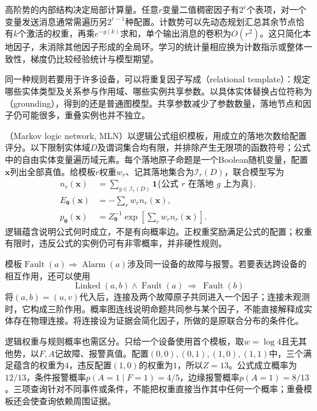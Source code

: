 高阶势的内部结构决定局部计算量。任意$r$变量二值稠密因子有$2^r$个表项，对一个变量发送消息通常需遍历另$2^{r-1}$种配置。计数势可以先动态规划汇总其余节点恰有$k$个激活的权重，再乘$e^{-g(k)}$求和，单个输出消息的卷积为$O(r^2)$。这只简化本地因子，未消除其他因子形成的全局环。学习的统计量相应换为计数指示或整体一致性，梯度仍比较经验统计与模型期望。

同一种规则若要用于许多设备，可以将重复因子写成（relational template）：规定哪些实体类型及关系参与作用域、哪些实例共享参数。以具体实体替换占位符称为（grounding），得到的还是普通图模型。共享参数减少了参数数量，落地节点和因子仍可能很多，重叠实例也并不独立。

（Markov logic network, MLN）以逻辑公式组织模板，用成立的落地次数给配置评分。以下限制实体域$D$及谓词集合均有限，并排除产生无限项的函数符号；公式中的自由实体变量遍历域元素。每个落地原子命题是一个Boolean随机变量，配置$\bm{x}$列出全部真值。给模板$r$权重$w_r$、记其落地集合为$\mathcal{I}_r(D)$，联合模型写为
\begin{equation}
  \begin{aligned}
    n_r(\bm{x})
      &=\sum_{g\in\mathcal{I}_r(D)}
           \mathbf{1}\{\text{公式 }r\text{ 在落地 }g\text{ 上为真}\},\\
    E_{\bm{\theta}}(\bm{x})&=-\sum_rw_rn_r(\bm{x}),\\
    p_{\bm{\theta}}(\bm{x})
      &=Z_{\bm{\theta}}^{-1}
          \exp\!\left[\sum_rw_rn_r(\bm{x})\right].
  \end{aligned}
  \label{eq:pgm-energy-models-mln}
\end{equation}
逻辑蕴含说明公式何时成立，不是有向概率边。正权重奖励满足公式的配置；权重有限时，违反公式的实例仍可有非零概率，并非硬性规则。

模板$\operatorname{Fault}(a)\Rightarrow\operatorname{Alarm}(a)$涉及同一设备的故障与报警。若要表达跨设备的相互作用，还可以使用
\[
  \operatorname{Linked}(a,b)\land\operatorname{Fault}(a)
       \ \Rightarrow\ \operatorname{Fault}(b)
\]
将$(a,b)=(u,v)$代入后，连接及两个故障原子共同进入一个因子；连接未观测时，它构成三阶作用。概率图连线说明命题共同参与某个因子，不能直接解释成实体存在物理连接。将连接设为证据会简化因子，所做的是原联合分布的条件化。

逻辑权重与规则概率也需区分。只给一个设备使用首个模板，取$w=\log4$且无其他势，以$F,A$记故障、报警真值。配置$(0,0),(0,1),(1,0),(1,1)$中，三个满足蕴含的权重为$4$，违反配置$(1,0)$的权重为$1$，所以$Z=13$。公式成立概率为$12/13$，条件报警概率$p(A=1\mid F=1)=4/5$，边缘报警概率$p(A=1)=8/13$。三项查询针对不同事件或条件，不能把权重直接当作其中任何一个概率；重叠模板还会使查询依赖周围证据。

